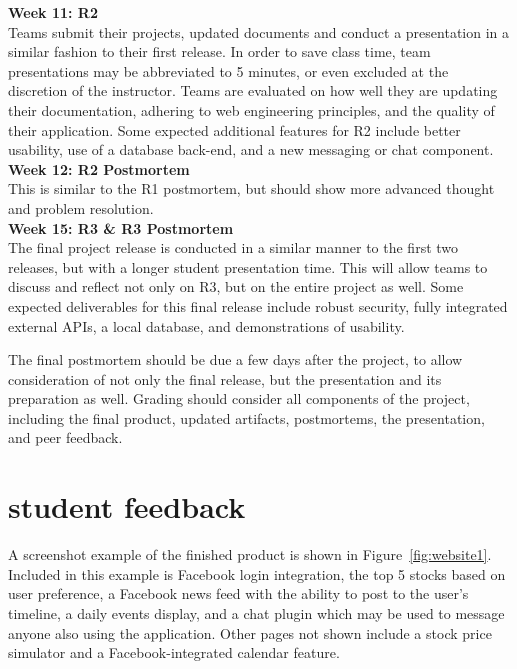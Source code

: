 \documentclass[conference]{IEEEtran}
\begin{document}
\textbf{Week 11: R2}\\
Teams submit their projects, updated documents and conduct a presentation in a similar fashion to their first release. In order to save class time, team presentations may be abbreviated to 5 minutes, or even excluded at the discretion of the instructor. Teams are evaluated on how well they are updating their documentation, adhering to web engineering principles, and the quality of their application. Some expected additional features for R2 include better usability, use of a database back-end, and a new messaging or chat component.\\


\textbf{Week 12: R2 Postmortem}\\
This is similar to the R1 postmortem, but should show more advanced thought and problem resolution. \\

\textbf{Week 15: R3 \& R3 Postmortem}\\
The final project release is conducted in a similar manner to the first two releases, but with a longer student presentation time. This will allow teams to discuss and reflect not only on R3, but on the entire project as well. Some expected deliverables for this final release include robust security, fully integrated external APIs, a local database, and demonstrations of usability.


The final postmortem should be due a few days after the project, to allow consideration of not only the final release, but the presentation and its preparation as well. Grading should consider all components of the project, including the final product, updated artifacts, postmortems, the presentation, and peer feedback. \\


\section{student feedback}
\label{sec: studentfeedback}

A screenshot example of the finished product is shown in Figure~\ref{fig:website1}. Included in this example is Facebook login integration, the top 5 stocks based on user preference, a Facebook news feed with the ability to post to the user's timeline, a daily events display, and a chat plugin which may be used to message anyone also using the application.  Other pages not shown include a stock price simulator and a Facebook-integrated calendar feature.
\end{document}

